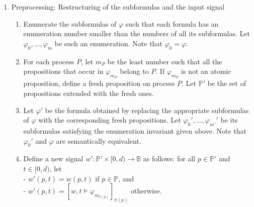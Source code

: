\documentclass[envcountsame, runningheads]{llncs}
\newcommand{\B}{\mathbb{B}}
\newcommand{\?}{\text{?}}
\begin{document}
	\begin{enumerate}
		\item Preprocessing: Restructuring of the subformulas and the input signal
		\begin{enumerate}[label=\arabic*.]
			\item Enumerate the subformulas of $\varphi$ such that each formula has an enumeration number smaller than the numbers of all its subformulas. Let $\varphi_0, \ldots, \varphi_m$ be such an enumeration. Note that $\varphi_0 = \varphi$.
			\item For each process $P$, let $m_P$ be the least number such that all the propositions that occur in $\varphi_{m_P}$ belong to $P$. If $\varphi_{m_P}$ is not an atomic proposition, define a fresh proposition on process $P$. Let $\mathbb{P}'$ be the set of propositions extended with the fresh ones.
			\item Let $\varphi'$ be the formula obtained by replacing the appropriate subformulas of $\varphi$ with the corresponding fresh propositions. Let $\varphi_0', \ldots, \varphi_{m'}'$ be its subformulas satisfying the enumeration invariant given above. Note that $\varphi_0'$  and $\varphi$ are semantically equivalent. %
			\item Define a new signal $w' : \mathbb{P}' \times [0,d) \to \B$ as follows: for all $p \in \mathbb{P}'$ and $t \in [0,d)$, let \\
			- $w'(p,t) = w(p,t)$ if $p \in \mathbb{P}$, and\\
			- $w'(p,t) = [w,t \models \varphi_{m_{\pi(p)}}]_{\pi(p)}$ otherwise.
		\end{enumerate}
		

\end{enumerate}
\end{document}
